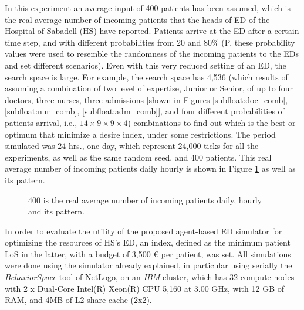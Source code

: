 \documentclass[11pt]{article} %
\begin{document}
In this experiment an average input of 400 patients has been assumed, which is the real average number of  incoming patients that the heads of ED of the Hospital of Sabadell (HS) have reported. Patients arrive at the ED after a certain time step, and with different probabilities from 20 and 80\% (P, these probability values were used to resemble the randomness of the incoming patients to the EDs and set different scenarios). Even with this very reduced setting of an ED, the search space is large. For example, the search space has 4,536 (which results of assuming a combination of two level of expertise, Junior or Senior, of up to four doctors, three nurses, three admissions [shown in Figures \ref{subfloat:doc_comb}, \ref{subfloat:nur_comb}, \ref{subfloat:adm_comb}], and four different probabilities of patients arrival, i.e., $14 \times 9 \times 9 \times 4$) combinations to find out which is the best or optimum that minimize a desire index, under some restrictions. 
The period simulated was 24 hrs., one day, which represent 24,000 ticks for all the experiments, as well as the same random seed, and 400 patients. This  real average number of incoming patients daily hourly is shown in Figure \ref{fig:input} as well as its pattern.

\begin{figure}[htb!]
{\par}
\caption{400 is the real average number of incoming patients daily, hourly and its pattern.}
\label{fig:input}
\end{figure}

In order to evaluate the utility of the proposed agent-based ED simulator for optimizing the resources of HS's ED, an index, defined as the minimum patient LoS in the latter, with a budget of 3,500 \euro \; per patient, was set. All simulations were done using the simulator already explained, in particular using serially the \emph{BehaviorSpace} tool of NetLogo, on an \textit{IBM} cluster, which has 32 compute nodes with 2 x Dual-Core Intel(R) Xeon(R) CPU 5,160 at 3.00 GHz, with 12 GB of RAM, and 4MB of L2 share cache (2x2).
\end{document}

